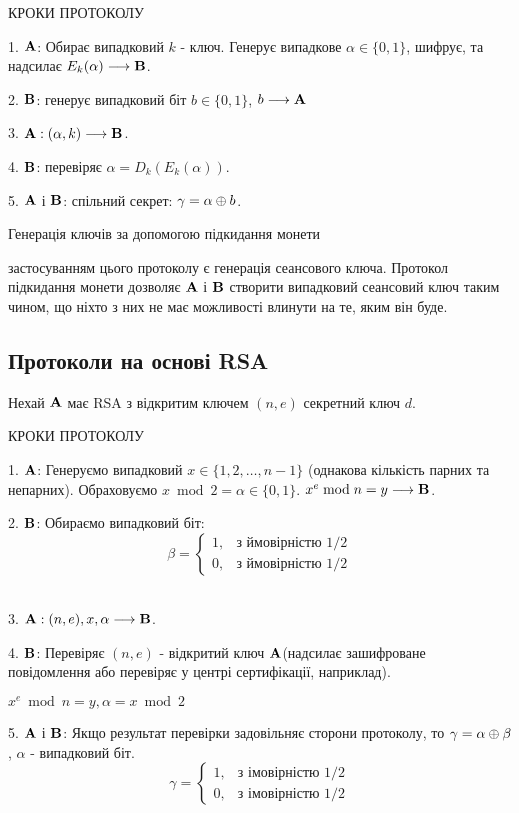 \begin{center}
КРОКИ ПРОТОКОЛУ
\end{center}
\par1. $\bold{A}$: Обирає випадковий $k$ - ключ. Генерує випадкове $\alpha \in \{0,1\}$, шифрує, та надсилає $E_k(\alpha)\longrightarrow \bold{B}$.
\par2. $\bold{B}$: генерує випадковий біт $b\in\{0,1\}$, $b\longrightarrow\bold{A}$

\par3. $\bold{A}: (\alpha, k)\longrightarrow\bold{B}$.
\par4. $\bold{B}$: перевіряє $\alpha = D_k(E_k(\alpha))$. 
\par5. $\bold{A}$ і $\bold{B}$: спільний секрет: $\gamma = \alpha\oplus b$.
\begin{center}
Генерація ключів за допомогою підкидання монети
\end{center}
 застосуванням цього протоколу є генерація сеансового ключа. Протокол підкидання монети дозволяє $\bold{A}$ і $\bold{B}$ створити випадковий сеансовий ключ таким чином, що ніхто з них не має можливості влинути на те, яким він буде.




\subsection{Протоколи на основі RSA}
Нехай $\bold{A}$ має RSA з відкритим ключем $(n, e)$ секретний ключ $d$.
\begin{center}
КРОКИ ПРОТОКОЛУ
\end{center}
\par1. $\bold{A}$: Генеруємо випадковий $x\in\{1, 2,\ldots, n-1\}$ (однакова кількість парних та непарних). Обраховуємо $x\bmod 2 = \alpha\in\{0,1\}$. $x^e\bmod n = y\longrightarrow \bold{B}$.\\
\par2. $\bold{B}$: Обираємо випадковий біт:
\begin{equation*}
\beta = 
	\begin{cases}
		1, &\text{з ймовірністю 1/2}\\
		0, &\text{з ймовірністю 1/2}
	\end{cases}
\end{equation*}\\
\par3. $\bold{A}: (n, e), x, \alpha \longrightarrow \bold{B}$.
\par4. $\bold{B}$: Перевіряє $(n, e)$ - відкритий ключ $\bold{A}$(надсилає зашифроване повідомлення або перевіряє у центрі сертифікації, наприклад).
\begin{center}
$x^e\bmod n = y, \alpha = x\bmod 2$
\end{center}
\par5. $\bold{A}$ і $\bold{B}$: Якщо результат перевірки задовільняє сторони протоколу, то $\gamma = \alpha \oplus \beta$, $\alpha$ - випадковий біт.
\begin{equation*}
\gamma = 
	\begin{cases}
		1, &\text{з імовірністю 1/2}\\
		0, &\text{з імовірністю 1/2}
	\end{cases}
\end{equation*}


%

